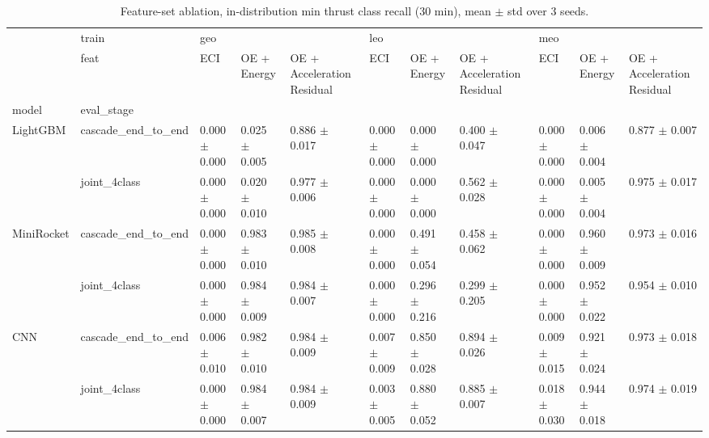 \begin{table}
\centering
\caption{Feature-set ablation, in-distribution min thrust class recall (30 min), mean $\pm$ std over 3 seeds.}
\label{tab:feat_minrec}
\begin{tabular}{lllllllllll}
\toprule
            & train & \multicolumn{3}{l}{geo} & \multicolumn{3}{l}{leo} & \multicolumn{3}{l}{meo} \\
            & feat &                ECI &        OE + Energy & OE + Acceleration Residual &                ECI &        OE + Energy & OE + Acceleration Residual &                ECI &        OE + Energy & OE + Acceleration Residual \\
model & eval_stage &                    &                    &                            &                    &                    &                            &                    &                    &                            \\
\midrule
LightGBM & cascade_end_to_end &  0.000 $\pm$ 0.000 &  0.025 $\pm$ 0.005 &          0.886 $\pm$ 0.017 &  0.000 $\pm$ 0.000 &  0.000 $\pm$ 0.000 &          0.400 $\pm$ 0.047 &  0.000 $\pm$ 0.000 &  0.006 $\pm$ 0.004 &          0.877 $\pm$ 0.007 \\
            & joint_4class &  0.000 $\pm$ 0.000 &  0.020 $\pm$ 0.010 &          0.977 $\pm$ 0.006 &  0.000 $\pm$ 0.000 &  0.000 $\pm$ 0.000 &          0.562 $\pm$ 0.028 &  0.000 $\pm$ 0.000 &  0.005 $\pm$ 0.004 &          0.975 $\pm$ 0.017 \\
MiniRocket & cascade_end_to_end &  0.000 $\pm$ 0.000 &  0.983 $\pm$ 0.010 &          0.985 $\pm$ 0.008 &  0.000 $\pm$ 0.000 &  0.491 $\pm$ 0.054 &          0.458 $\pm$ 0.062 &  0.000 $\pm$ 0.000 &  0.960 $\pm$ 0.009 &          0.973 $\pm$ 0.016 \\
            & joint_4class &  0.000 $\pm$ 0.000 &  0.984 $\pm$ 0.009 &          0.984 $\pm$ 0.007 &  0.000 $\pm$ 0.000 &  0.296 $\pm$ 0.216 &          0.299 $\pm$ 0.205 &  0.000 $\pm$ 0.000 &  0.952 $\pm$ 0.022 &          0.954 $\pm$ 0.010 \\
CNN & cascade_end_to_end &  0.006 $\pm$ 0.010 &  0.982 $\pm$ 0.010 &          0.984 $\pm$ 0.009 &  0.007 $\pm$ 0.009 &  0.850 $\pm$ 0.028 &          0.894 $\pm$ 0.026 &  0.009 $\pm$ 0.015 &  0.921 $\pm$ 0.024 &          0.973 $\pm$ 0.018 \\
            & joint_4class &  0.000 $\pm$ 0.000 &  0.984 $\pm$ 0.007 &          0.984 $\pm$ 0.009 &  0.003 $\pm$ 0.005 &  0.880 $\pm$ 0.052 &          0.885 $\pm$ 0.007 &  0.018 $\pm$ 0.030 &  0.944 $\pm$ 0.018 &          0.974 $\pm$ 0.019 \\

\end{tabular}
\end{table}

